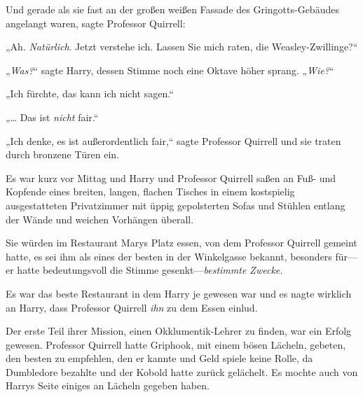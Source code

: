 Und gerade als sie fast an der großen weißen Fassade des Gringotts-Gebäudes angelangt waren, sagte Professor Quirrell:

„Ah. \emph{Natürlich}. Jetzt verstehe ich. Lassen Sie mich raten, die Weasley-Zwillinge?“

„\emph{Was?}“ sagte Harry, dessen Stimme noch eine Oktave höher sprang. „\emph{Wie?}“

„Ich fürchte, das kann ich nicht sagen.“

„… Das ist \emph{nicht} fair.“

„Ich denke, es ist außerordentlich fair,“ sagte Professor Quirrell und sie traten durch bronzene Türen ein.

\later

Es war kurz vor Mittag und Harry und Professor Quirrell saßen an Fuß- und Kopfende eines breiten, langen, flachen Tisches in einem kostspielig ausgestatteten Privatzimmer mit üppig gepolsterten Sofas und Stühlen entlang der Wände und weichen Vorhängen überall.

Sie würden im Restaurant Marys Platz essen, von dem Professor Quirrell gemeint hatte, es sei ihm als eines der besten in der Winkelgasse bekannt, besonders für—er hatte bedeutungsvoll die Stimme gesenkt—\emph{bestimmte Zwecke.}

Es war das beste Restaurant in dem Harry je gewesen war und es nagte wirklich an Harry, dass Professor Quirrell \emph{ihn} zu dem Essen einlud.

Der erste Teil ihrer Mission, einen Okklumentik-Lehrer zu finden, war ein Erfolg gewesen. Professor Quirrell hatte Griphook, mit einem bösen Lächeln, gebeten, den besten zu empfehlen, den er kannte und Geld spiele keine Rolle, da Dumbledore bezahlte und der Kobold hatte zurück gelächelt. Es mochte auch von Harrys Seite einiges an Lächeln gegeben haben.

